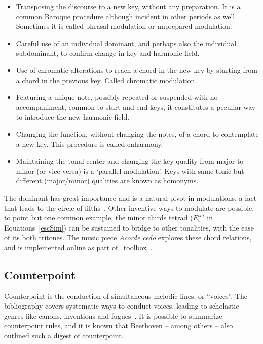 \begin{itemize}
    \item Transposing the discourse to a new key, without any preparation. It is a common Baroque procedure although incident in other periods as well. Sometimes it is 
    called phrasal modulation or unprepared modulation.
    \item Careful use of an individual dominant, and perhaps also the individual
    subdominant, to confirm change in key and harmonic field.
    \item Use of chromatic alterations to reach a chord in the new key by starting from a chord in the previous key. Called chromatic modulation.
    \item Featuring a unique note, possibly repeated or suspended with no accompaniment, common to start and end keys, it constitutes a peculiar way
    to introduce the new harmonic field.
    \item Changing the function, without changing the notes, of a chord to
    contemplate a new key. This procedure is called enharmony.
    \item Maintaining the tonal center and changing the key quality from major to minor
    (or vice-versa) is a `parallel modulation'. Keys with same tonic but
		different (major/minor) qualities are known as homonyms.
\end{itemize}

The dominant has great importance and is a natural pivot in modulations,
a fact that leads to the circle of fifths~\cite{Harmonia,Salzer,Koellheuteur,Harmony}.
Other inventive ways to modulate are possible, to point but one common example, the minor thirds tetrad ($E_i^{tm}$ in Equations~\ref{escSim}) can be sustained to bridge to other tonalities, with the ease of its both tritones.
The music piece \emph{Acorde cedo} explores these chord relations, and is implemented online as part of \massa\ toolbox~\cite{MASSA}.

\subsection{Counterpoint}\label{subsec:contraponto}
Counterpoint is the conduction of simultaneous melodic lines, or ``voices''. The bibliography covers systematic ways to conduct voices, leading to scholastic genres like canons, inventions and fugues~\cite{Fux,SchoenbergContra}. It is possible to
summarize counterpoint rules, and it is known that Beethoven --
among others -- also outlined such a digest of counterpoint.

